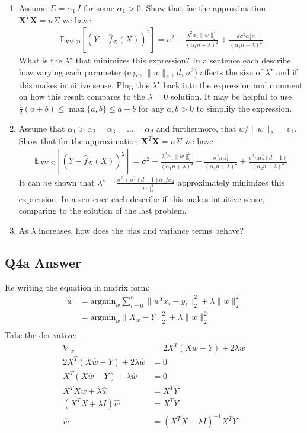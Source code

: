 \documentclass{article}
\newcommand{\1}{\mathbf{1}}
\def\E{\mathbb{E}}
\newcommand{\mb}[1]{\mathbf{#1}}
\newcommand{\mc}[1]{\mathcal{#1}}
\begin{document}
\begin{enumerate}
    \item Assume $\Sigma= \alpha_1 \, I$ for some $\alpha_1 >0$. Show that for the approximation $\mb{X}^T \mb{X} = n \Sigma$ we have
    \begin{align*}
    \E_{XY,\mc{D}}[ (Y-\widehat{f}_{\mc{D}}(X))^2] = \sigma^2 + \frac{\lambda^2 \alpha_1 \|w\|_2^2}{(\alpha_1 n+\lambda)^2} + \frac{d \sigma^2 \alpha_1^2 n}{(\alpha_1 n + \lambda)^2}
    \end{align*}
    What is the $\lambda^\star$ that minimizes this expression? 
    In a sentence each describe how varying each parameter (e.g., $\|w\|_2$, $d$, $\sigma^2$) affects the size of $\lambda^\star$ and if this makes intuitive sense.
    Plug this $\lambda^\star$ back into the expression and comment on how this result compares to the $\lambda=0$ solution. It may be helpful to use $\tfrac{1}{2}(a+b) \leq \max\{a,b\} \leq a+b$ for any $a,b>0$ to simplify the expression.  
    \item Assume that $\alpha_1 > \alpha_2 = \alpha_3 = \dots = \alpha_d$ and furthermore, that $w/\|w\|_2 = v_1$. Show that for the approximation $\mb{X}^T \mb{X} = n \Sigma$ we have
    \begin{align*}
    \E_{XY,\mc{D}}[ (Y-\widehat{f}_{\mc{D}}(X))^2] = \sigma^2 + \frac{\lambda^2 \alpha_1 \|w\|_2^2}{(\alpha_1 n+\lambda)^2} + \frac{\sigma^2 n \alpha_1^2}{(\alpha_1 n + \lambda)^2} + \frac{\sigma^2 n \alpha_2^2 (d-1)}{(\alpha_2 n + \lambda)^2}
    \end{align*}
    It can be shown that $\lambda^\star = \frac{\sigma^2 + \sigma^2(d-1)\alpha_1/\alpha_2}{\|w\|_2^2}$ approximately minimizes this expression. 
    In a sentence each describe if this makes intuitive sense, comparing to the solution of the last problem.
    \item As $\lambda$ increases, how does the bias and variance terms behave?
     
\end{enumerate}

\subsection{Q4a Answer}
Re writing the equation in matrix form:
\begin{align*}
\widehat{w} & = \text{argmin}_{w} \sum_{i=0}^{n} \| w^Tx_{i} - y_{i} \|^{2}_{2} + \lambda \|w\|_{2}^{2} \\
& = \text{argmin}_w \| X_w - Y \|_2^2 + \lambda \|w\|_2^2 \\
\end{align*}
Take the derivative:
\begin{align*}
    \nabla_{w} & = 2 X^T(X w -Y) + 2 \lambda w \\
    2 X^T(X\widehat{w} -Y) + 2 \lambda \widehat{w} & = 0 \\
    X^T(X\widehat{w} -Y) + \lambda \widehat{w} & = 0 \\
    X^TX\widehat{w} + \lambda \widehat{w} & = X^T Y \\
    (X^TX + \lambda I ) \widehat{w} & = X^T Y \\
     \widehat{w} & =(X^TX + \lambda I )^{-1} X^T Y \\
\end{align*}
\end{document}
